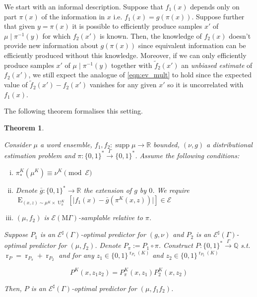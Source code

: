 \documentclass{article}
\numberwithin{equation}{section}
\theoremstyle{definition}
\theoremstyle{plain}
\newtheorem{theorem}{Theorem}[section]
\newcommand{\Bool}{\{0,1\}}
\newcommand{\Words}{{\Bool^*}}
\newcommand{\WordsLen}[1]{{\Bool^{#1}}}
\DeclareMathOperator{\Supp}{supp}
\DeclareMathOperator{\E}{E}
\DeclareMathOperator{\R}{r}
\DeclareMathOperator{\Un}{U}
\newcommand{\Rats}{\mathbb{Q}}
\newcommand{\Reals}{\mathbb{R}}
\newcommand{\Abs}[1]{\lvert #1 \rvert}
\newcommand{\MGrow}{\mathrm{M}\Gamma}
\newcommand{\Fall}{\mathcal{E}}
\newcommand{\ESG}{\Fall^\sharp(\Gamma)}
\newcommand{\EMG}{\Fall(\MGrow)}
\newcommand{\Scheme}{\xrightarrow{\Gamma}}
\begin{document}
We start with an informal description. Suppose that $f_1(x)$ depends only on part $\pi(x)$ of the information in $x$ i.e. $f_1(x) = g(\pi(x))$. Suppose further that given $y=\pi(x)$ it is possible to efficiently produce samples $x'$ of $\mu \mid \pi^{-1}(y)$ for which $f_2(x')$ is known. Then, the knowledge of $f_2(x)$ doesn't provide new information about $g(\pi(x))$ since equivalent information can be efficiently produced without this knowledge.
 Moreover, if we can only efficiently produce samples $x'$ of $\mu \mid \pi^{-1}(y)$ together with $\tilde{f}_2(x')$ an \emph{unbiased estimate} of $f_2(x')$, we still expect the analogue of \ref{eqn:ev_mult} to hold since the expected value of $\tilde{f}_2(x') - f_2(x')$ vanishes for any given $x'$ so it is uncorrelated with $f_1(x)$.
 
The following theorem formalises this setting.

\begin{samepage}
\begin{theorem}
\label{thm:mult}

Consider $\mu$ a word ensemble, $f_1, f_2: \Supp \mu \rightarrow \Reals$ bounded, $(\nu,g)$ a distributional estimation problem and $\pi: \Words \Scheme \Words$. Assume the following conditions:

\begin{enumerate}[(i)]

\item\label{con:thm__mult__dist} $\pi_*^{K}(\mu^{K}) \equiv \nu^{K} \pmod \Fall$

\item\label{con:thm__mult__fun} Denote ${\bar{g}: \Words \rightarrow \Reals}$ the extension of $g$ by $0$.  We require ${\E_{(x,z) \sim \mu^{K} \times \Un_\pi^{K}}[\Abs{f_1(x)-\bar{g}(\pi^{K}(x,z))}] \in \Fall}$

\item\label{con:thm__mult__smp} $(\mu, f_2)$ is $\EMG$-samplable relative to $\pi$.

\end{enumerate}

Suppose $P_1$ is an $\ESG$-optimal predictor for $(g,\nu)$ and $P_2$ is an $\ESG$-optimal predictor for $(\mu,f_2)$. Denote $P_\pi := P_1 \circ \pi$. Construct ${P: \Words \Scheme \Rats}$ s.t. $\R_P=\R_{P_\pi}+\R_{P_2}$ and for any $z_1 \in \WordsLen{\R_{P_\pi}(K)}$ and $z_2 \in \WordsLen{\R_{P_2}(K)}$

\begin{equation}
P^{K}(x,z_1 z_2)=P_\pi^{K}(x,z_1) P_2^{K}(x,z_2)
\end{equation}

Then, $P$ is an $\ESG$-optimal predictor for $(\mu,f_1 f_2)$.

\end{theorem}
\end{samepage}
\end{document}
